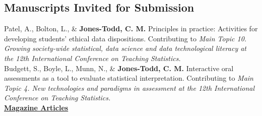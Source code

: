 \documentclass[10pt,a4paper]{moderncv}
\begin{document}
\subsection{Manuscripts Invited for Submission}

Patel, A., Bolton, L., \& \textbf{Jones-Todd, C. M.} Principles in practice: Activities for developing students' ethical data dispositions. Contributing to \textit{Main Topic 10. Growing society-wide statistical, data science and data technological literacy at the 12th International Conference on Teaching Statistics.}\\

Budgett, S., Boyle, L., Munn, N.,  \& \textbf{Jones-Todd, C. M.} Interactive oral assessments as a tool to evaluate statistical interpretation. Contributing to \textit{Main Topic 4. New technologies and paradigms in assessment at the 12th International Conference on Teaching Statistics.}\\








 
 
\underline{\textbf{Magazine Articles}}\\

\vspace{-3pt}
\end{document}
